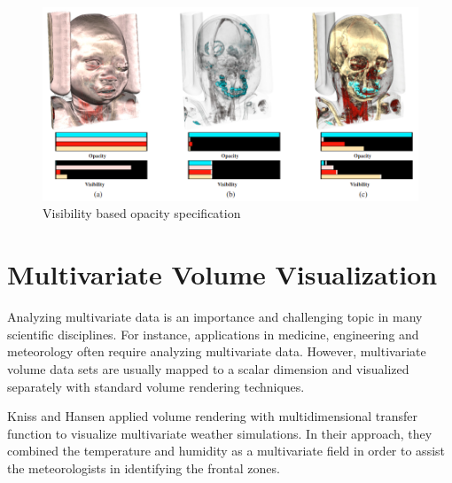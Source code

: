

\cite{correa_visibility_2011}
\cite{wang_efficient_2011}

\cite{wan_fast_2010}

\begin{figure}
	\centering
	\includegraphics[width=1\linewidth]{images/wang_efficient_2011}
	\caption{Visibility based opacity specification \cite{wang_efficient_2011}}
	\label{fig:wang_efficient_2011}
\end{figure}

\cite{mak_visibility-aware_2011}

\cite{bronstad_visibility_2012}



\cite{ruiz_automatic_2011}
\cite{bramon_information_2013}

\cite{tang_depth-based_2011}
\cite{zhou_opacity_2014}

\section{Multivariate Volume Visualization}
Analyzing multivariate data is an importance and challenging topic in many scientific disciplines. For instance, applications in medicine, engineering and meteorology often require analyzing multivariate data.
However, multivariate volume data sets are usually mapped to a scalar dimension and visualized separately with standard volume rendering techniques.

Kniss and Hansen \cite{kniss_volume_2002} applied volume rendering with multidimensional transfer function to visualize multivariate weather simulations. In their approach, they combined the temperature and humidity as a multivariate field in order to assist the meteorologists in identifying the frontal zones. 

